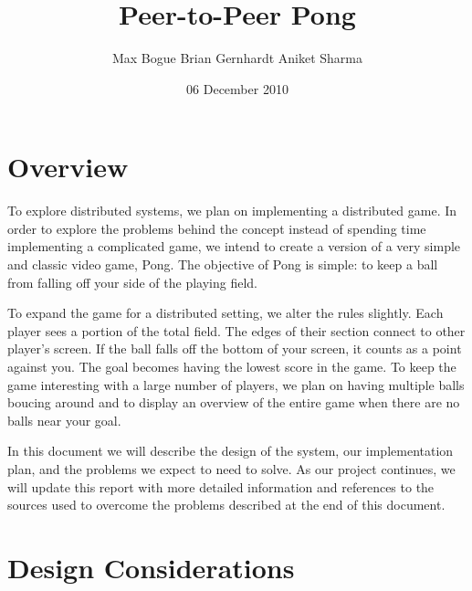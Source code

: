 \documentclass{sig-alternate}
\begin{document}
\title{Peer-to-Peer Pong}
\author{
\alignauthor
Max Bogue
\alignauthor
Brian Gernhardt
\alignauthor
Aniket Sharma
}
\date{06 December 2010}
\maketitle

\section{Overview}
\label{overview}


To explore distributed systems, we plan on implementing a distributed game.
In order to explore the problems behind the concept instead of spending
time implementing a complicated game, we intend to create a version of a
very simple and classic video game, Pong.  The objective of Pong is simple:
to keep a ball from falling off your side of the playing field.

To expand the game for a distributed setting, we alter the rules slightly.
Each player sees a portion of the total field.  The edges of their section
connect to other player's screen.  If the ball falls off the bottom of your
screen, it counts as a point against you.  The goal becomes having the
lowest score in the game.  To keep the game interesting with a large number
of players, we plan on having multiple balls boucing around and to display
an overview of the entire game when there are no balls near your goal.

In this document we will describe the design of the system, our
implementation plan, and the problems we expect to need to solve.  As our
project continues, we will update this report with more detailed
information and references to the sources used to overcome the problems
described at the end of this document.

\section{Design Considerations}
\label{design considerations}
\end{document}

